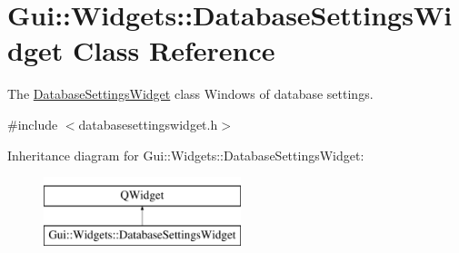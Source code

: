 \hypertarget{classGui_1_1Widgets_1_1DatabaseSettingsWidget}{\section{Gui\-:\-:Widgets\-:\-:Database\-Settings\-Widget Class Reference}
\label{classGui_1_1Widgets_1_1DatabaseSettingsWidget}
}


The \hyperlink{classGui_1_1Widgets_1_1DatabaseSettingsWidget}{Database\-Settings\-Widget} class Windows of database settings.  




{\ttfamily \#include $<$databasesettingswidget.\-h$>$}

Inheritance diagram for Gui\-:\-:Widgets\-:\-:Database\-Settings\-Widget\-:\begin{figure}[H]
\begin{center}
\leavevmode
\includegraphics[height=2.000000cm]{de/d51/classGui_1_1Widgets_1_1DatabaseSettingsWidget}
\end{center}
\end{figure}
